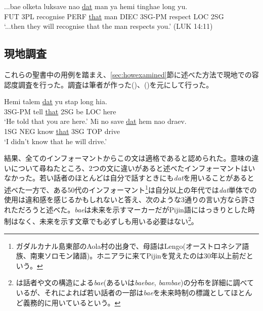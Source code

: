 \begin{exe}
\ex
\gll ...bae olketa luksave nao \underline{dat} man ya hemi tinghae long yu.\\
FUT 3PL recognise PERF \underline{that} man DIEC 3SG-PM respect LOC 2SG\\
\glt `...then they will recognise that the man respects you.' (LUK 14:11)
\end{exe}


\subsection{現地調査}\label{sec:datfield}

これらの聖書中の用例を踏まえ、\ref{sec:howexamined}節に述べた方法で現地での容認度調査を行った。調査は筆者が作った()、()を元にして行った。

\begin{exe}
\ex\label{dat1}
\gll Hemi talem \underline{dat} yu stap long hia.\\
3SG-PM tell \underline{that} 2SG be LOC here\\
\glt `He told that you are here.'
\ex\label{dat2}
\gll Mi no save \underline{dat} hem nao draev.\\
1SG NEG know \underline{that} 3SG TOP drive\\
\glt `I didn't know that he will drive.'
\end{exe}

結果、全てのインフォーマントからこの文は適格であると認められた。意味の違いについて尋ねたところ、2つの文に違いがあると述べたインフォーマントはいなかった。若い話者のほとんどは自分で話すときにも\textit{dat}を用いることがあると述べた一方で、ある50代のインフォーマント\footnote{
\label{fn:lengo}ガダルカナル島東部のAola村の出身で、母語はLengo(オーストロネシア語族、南東ソロモン諸語)。ホニアラに来てPijinを覚えたのは30年以上前だという。}は自分以上の年代では\textit{dat}単体での使用は違和感を感じるかもしれないと答え、次のような3通りの言い方なら許されただろうと述べた。\textit{bae}は未来を示すマーカーだがPijin語にはっきりとした時制はなく\citep[56]{eric}、未来を示す文章でも必ずしも用いる必要はない\footnote{
  \cite{bae}は話者や文の構造による\textit{bae}(あるいは\textit{baebae}, \textit{bambae})の分布を詳細に調べているが、それによれば若い話者の一部は\textit{bae}を未来時制の標識としてほとんど義務的に用いているという。
}。


